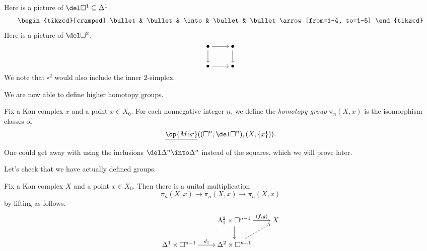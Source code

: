 \documentclass[../notes.tex]{subfiles}
\begin{document}
\begin{example}
	Here is a picture of $\del\square^1\subseteq\Delta^1$.
	\[\begin{tikzcd}[cramped]
		\bullet & \bullet & \into & \bullet & \bullet
		\arrow[from=1-4, to=1-5]
	\end{tikzcd}\]
	Here is a picture of $\del\square^2$.
	\[\begin{tikzcd}[cramped]
		\bullet & \bullet \\
		\bullet & \bullet
		\arrow[from=1-1, to=1-2]
		\arrow[from=1-1, to=2-1]
		\arrow[from=1-2, to=2-2]
		\arrow[from=2-1, to=2-2]
	\end{tikzcd}\]
	We note that $\square^2$ would also include the inner $2$-simplex.
\end{example}
We are now able to define higher homotopy groups.
\begin{definition}
	Fix a Kan complex $x$ and a point $x\in X_0$. For each nonnegative integer $n$, we define the \textit{homotopy group} $\pi_n(X,x)$ is the isomorphism classes of
	\[\underline{\op{Mor}}((\square^n,\del\square^n),(X,\{x\})).\]
\end{definition}
\begin{remark}
	One could get away with using the inclusions $\del\Delta^n\into\Delta^n$ instead of the squares, which we will prove later.
\end{remark}
Let's check that we have actually defined groups.
\begin{lemma}
	Fix a Kan complex $X$ and a point $x\in X_0$. Then there is a unital multiplication
	\[\pi_n(X,x)\to\pi_n(X,x)\to\pi_n(X,x)\]
	by lifting as follows.
	\[\begin{tikzcd}[cramped]
		& {\Lambda_1^2\times\square^{n-1}} & X \\
		{\Delta^1\times\square^{n-1}} & {\Delta^2\times\square^{n-1}}
		\arrow["{(f,g)}", from=1-2, to=1-3]
		\arrow[from=1-2, to=2-2]
		\arrow["{d_1}", from=2-1, to=2-2]
		\arrow[dashed, from=2-2, to=1-3]
	\end{tikzcd}\]
\end{lemma}
\end{document}

